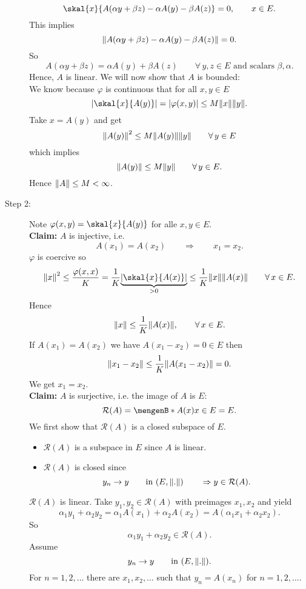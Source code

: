 \begin{beweis}
\begin{description}
		\[
			\skal{x}{A(\alpha y + \beta z)- \alpha A(y) - \beta A(z)} = 0, \qquad  x \in E.
		\]
		This implies 
		\[
			\norm{A(\alpha y + \beta z) - \alpha A(y) - \beta A(z)} = 0.
		\]
		So \[
			A( \alpha y+ \beta z) = \alpha A(y) + \beta A(z) \qquad \forall\, y,z \in E \text{ and scalars }\beta,\alpha.
		\]
		Hence, $A$ is linear. We will now show that $A$ is bounded: \\
		We know because $\varphi$ is continuous that for all $x,y \in E$
		\[
			\abs{\skal{x}{A(y)}} = \abs{\varphi(x,y)} \leq M \norm{x} \norm{y}.
		\]
		Take $x = A(y)$ and get
		\[
			\norm{A(y)}^2 \leq  M \norm{A(y)} \norm{y} \qquad \forall\, y \in E
		\]
		which implies
		\[
			\norm{A(y)} \leq M \norm{y} \qquad \forall\, y \in E.
		\]
		Hence $\norm{A} \leq M < \infty$.
		\item[Step 2:] Note $\varphi(x,y) = \skal{x}{A(y)}$ for alle $x,y \in E$. \\
		\textbf{Claim:} \text{    }$A$ is injective, i.e.
		\[
			A(x_1) = A(x_2) \qquad \Rightarrow \qquad x_1 = x_2.
 		\]
		$\varphi$ is coercive so
		\[
			\norm{x}^2 \leq \frac{\varphi(x,x)}{K} = \frac{1}{K} \underset{>0}{\underbrace{\abs{\skal{x}{A(x)}}}} \leq \frac{1}{K} \norm{x} \norm{A(x)} \qquad \forall\,  x \in E.
		\]
		Hence \[
			\norm{x} \leq  \frac{1}{K} \norm{A(x)}, \qquad \forall\, x \in E.
		\]
		If $A(x_1) = A(x_2)$ we have $A(x_1-x_2) = 0 \in E$ then
		\[
			\norm{x_1 - x_2} \leq \frac{1}{K} \norm{A(x_1 -x_2)} = 0.
		\]
		We get $x_1 = x_2$. \\
		\textbf{Claim:} \text{    }$A$ is surjective, i.e. the image of $A$ is $E$: \[
			\mathcal{R}(A) = \set[A(x)]{x \in E} = E.
		\] 
		We first show that $\mathcal{R}(A)$ is a closed subspace of $E$. 
		\begin{itemize}
			\item $\mathcal{R}(A)$ is a subspace in $E$ since $A$ is linear.
			\item $\mathcal{R}(A)$ is closed since
			\[
				y_n \to y \qquad \text{in }(E, \norm{.}) \qquad \Rightarrow y \in \mathcal{R}(A).
			\]			
		\end{itemize}
		$\mathcal{R}(A)$ is linear. Take $y_1,y_2 \in \mathcal{R}(A)$ with preimages $x_1,x_2$ and yield
		\[
			\alpha_1 y_1 + \alpha_2 y_2 = \alpha_1 A(x_1) + \alpha_2 A(x_2) = A(\alpha_1 x_1 + \alpha_2 x_2).
		\]
		So \[
			\alpha_1 y_1 + \alpha_2 y_2 \in \mathcal{R}(A).
		\]
		Assume \[
			y_n \to y \qquad \text{in }(E, \norm{.}).
		\]
		For $n=1,2,\dots$ there are $x_1,x_2,\dots$ such that $y_n= A(x_n)$ for $n=1,2,\dots$. \\

\end{description}
\end{beweis}
